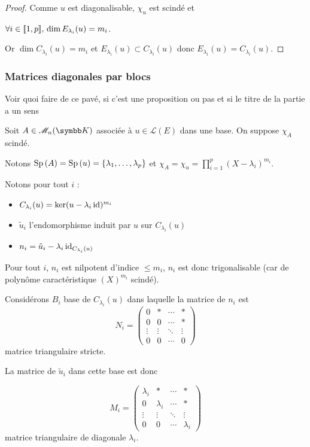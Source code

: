\begin{proof}
    Comme $u$ est diagonalisable, $\chi_u$ est scindé et 
    
    $\forall i \in [\![1, p]\!], \, \dim E_{\lambda_i}(u) = m_i$.

    Or $\dim C_{\lambda_i}(u) = m_i$ et $E_{\lambda_i}(u) \subset C_{\lambda_i}(u)$ donc 
    $E_{\lambda_i}(u) = C_{\lambda_i}(u)$.
\end{proof}


\subsubsection{Matrices diagonales par blocs}

Voir quoi faire de ce pavé, si c'est une proposition ou pas et si le titre de la partie a un sens 

Soit $A \in \mathscr M_n(\K)$ associée à $u \in \mathscr L(E)$ dans une base. On suppose 
$\chi_A$ scindé.

Notons $\operatorname{Sp} \, (A) = \operatorname{Sp} \,(u) = \{\lambda_1, \ldots, \lambda_p\}$ et 
$\chi_A = \chi_u = \displaystyle \prod_{i = 1 }^{ p } (X - \lambda_i)^{m_i}$.

Notons pour tout $i$ : 
\begin{itemize}
    \item $C_{\lambda_i}(u) = \ker (u - \lambda_i \operatorname{id})^{m_i}$
    \item $\tilde u_i$ l'endomorphisme induit par $u$ sur $C_{\lambda_i}(u)$
    \item $n_i = \tilde u_i - \lambda_i \operatorname{id}_{C_{\lambda_i}(u)}$
\end{itemize}

Pour tout $i$, $n_i$ est nilpotent d'indice $\leqslant m_i$, 
$n_i$ est donc trigonalisable (car de polynôme caractéristique $(X)^{m_i}$ scindé).

Considérons $B_i$ base de $C_{\lambda_i}(u)$ dans laquelle la matrice de $n_i$ est 
$$N_i = \begin{pmatrix}
    0 & * & \cdots & * \\
    0 & 0 & \cdots & * \\
    \vdots & \vdots & \ddots & \vdots \\
    0 & 0 & \cdots & 0
\end{pmatrix}$$ matrice triangulaire stricte. 

La matrice de $\tilde u_i$ dans cette base est donc 

$$M_i = \begin{pmatrix}
    \lambda_i & * & \cdots & * \\
    0 & \lambda_i & \cdots & * \\
    \vdots & \vdots & \ddots & \vdots \\
    0 & 0 & \cdots & \lambda_i
\end{pmatrix}$$ matrice triangulaire de diagonale $\lambda_i$.

